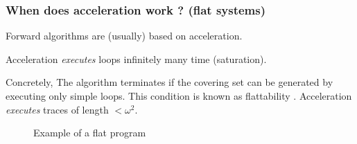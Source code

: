 \documentclass{beamer}
\begin{document}
\begin{frame}
  \frametitle{When does acceleration work ? (flat systems)}

  Forward algorithms are (usually) based on acceleration.

  Acceleration \emph{executes} loops infinitely many time (saturation).

  \vspace{10pt}

  Concretely, The algorithm terminates if the covering set can be generated by executing only simple loops.
  This condition is known as flattability \cite{DBLP:conf/atva/BardinFLS05}.
  Acceleration \emph{executes} traces of length $< \omega^2$.


  
  \begin{figure}
  \caption{Example of a flat program}
  \end{figure}

\end{frame}
\end{document}
